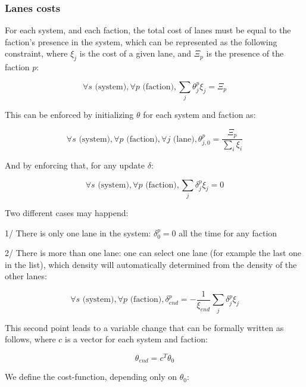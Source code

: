 \documentclass[11pt,a4paper]{article}		%
\begin{document}
\subsubsection{Lanes costs}

For each system, and each faction, the total cost of lanes must be equal to the faction's presence in the system, which can be represented as the following constraint, where $\xi_j$ is the cost of a given lane, and $\Xi_p$ is the presence of the faction $p$:

\begin{equation}
\forall s \text{ (system)}, \forall p \text{ (faction)}, \sum_j \theta_j^p \xi_j = \Xi_p
\end{equation}

This can be enforced by initializing $\theta$ for each system and faction as:

\begin{equation}
\forall s \text{ (system)}, \forall p \text{ (faction)}, \forall j \text{ (lane)}, \theta_{j,0}^p = \dfrac{\Xi_p}{\sum_i \xi_i}
\end{equation}

And by enforcing that, for any update $\delta$:

\begin{equation}
\forall s \text{ (system)}, \forall p \text{ (faction)}, \sum_j \delta_j^p \xi_j = 0
\end{equation}

Two different cases may happend:

1/ There is only one lane in the system: $\delta_0^p = 0$ all the time for any faction

2/ There is more than one lane: one can select one lane (for example the last one in the list), which density will automatically determined from the density of the other lanes:

\begin{equation}
\forall s \text{ (system)}, \forall p \text{ (faction)}, \delta_{end}^p = - \dfrac{1}{\xi_{end}} \sum_j \delta_j^p \xi_j
\end{equation}

This second point leads to a variable change that can be formally written as follows, where $c$ is a vector for each system and faction:

\begin{equation}
\theta_{end} = c^T \theta_0
\end{equation}

We define the cost-function, depending only on $\theta_0$:
\end{document}
